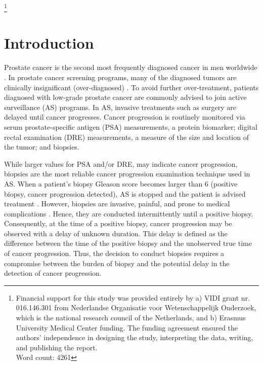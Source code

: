 \documentclass[Afour,sagev,times]{sagej}
\begin{document}
\footnote{Financial support for this study was provided entirely by a) VIDI grant nr. 016.146.301 from Nederlandse Organisatie voor Wetenschappelijk Onderzoek, which is the national research council of the Netherlands, and b) Erasmus University Medical Center funding. The funding agreement ensured the authors’ independence in designing the study, interpreting the data, writing, and publishing the report.\\Word count: 4261}
\thefootnote

\section{Introduction}
\label{sec:introduction}
Prostate cancer is the second most frequently diagnosed cancer in men worldwide \cite{GlobalCancerStats2012}. In prostate cancer screening programs, many of the diagnosed tumors are clinically insignificant (over-diagnosed) \cite{etzioni2002overdiagnosis}. To avoid further over-treatment, patients diagnosed with low-grade prostate cancer are commonly advised to join active surveillance (AS) programs. In AS, invasive treatments such as surgery are delayed until cancer progresses. Cancer progression is routinely monitored via serum prostate-specific antigen (PSA) measurements, a protein biomarker; digital rectal examination (DRE) measurements, a measure of the size and location of the tumor; and biopsies.

While larger values for PSA and/or DRE, may indicate cancer progression, biopsies are the most reliable cancer progression examination technique used in AS. When a patient's biopsy Gleason score becomes larger than 6 (positive biopsy, cancer progression detected), AS is stopped and the patient is advised treatment \cite{bokhorst2015compliance}. However, biopsies are invasive, painful, and prone to medical complications \cite{ehdaie2014impact,fujita2009serial}. Hence, they are conducted intermittently until a positive biopsy. Consequently, at the time of a positive biopsy, cancer progression may be observed with a delay of unknown duration. This delay is defined as the difference between the time of the positive biopsy and the unobserved true time of cancer progression. Thus, the decision to conduct biopsies requires a compromise between the burden of biopsy and the potential delay in the detection of cancer progression.
\end{document}
